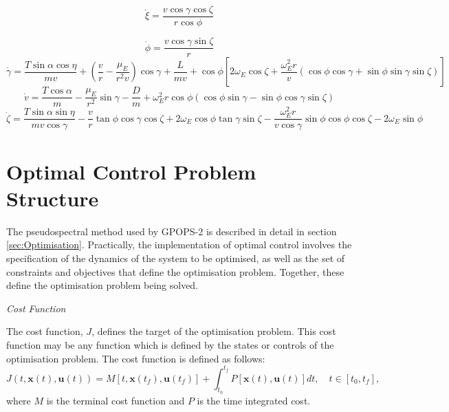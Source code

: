 \begin{equation}
\dot{\xi} = \frac{v\cos \gamma \cos \zeta}{r \cos \phi}
\end{equation}

\begin{equation}
\dot{\phi} = \frac{v\cos\gamma\sin\zeta}{r}
\end{equation}
\begin{equation}
\dot{\gamma} = \frac{T\sin\alpha \cos\eta}{mv} + (\frac{v}{r}-\frac{\mu_E}{r^2 v})\cos\gamma + \frac{L}{mv}
+ \cos\phi[2\omega_E \cos\zeta + \frac{\omega_E^2 r}{v}(\cos\phi\cos\gamma+\sin\phi\sin\gamma\sin\zeta)]
\end{equation}
\begin{equation}
\dot{v} = \frac{T\cos\alpha}{m}-\frac{\mu_E}{r^2}\sin\gamma - \frac{D}{m}
+ \omega_E^2 r\cos\phi(\cos\phi\sin\gamma-\sin\phi\cos\gamma\sin\zeta)
\end{equation}
\begin{equation}\label{eq:heading}
\dot{\zeta} = \frac{T\sin\alpha \sin\eta}{mv \cos \gamma}-\frac{v}{r}\tan\phi\cos\gamma\cos\zeta +2\omega_E\cos\phi\tan\gamma\sin\zeta - \frac{\omega_E^2 r}{v\cos\gamma}\sin\phi\cos\phi\cos\zeta-2\omega_E\sin\phi 
\end{equation}






\section{Optimal Control Problem Structure}

The pseudospectral method used by GPOPS-2 is described in detail in section \ref{sec:Optimisation}. Practically, the implementation of optimal control involves the specification of the dynamics of the system to be optimised, as well as the set of constraints and objectives that define the optimisation problem. 
 Together, these define the optimisation problem being solved.

\noindent \textit{Cost Function}

\noindent The cost function, $J$, defines the target of the optimisation problem. 
This cost function may be any function which is defined by the states or controls of the optimisation problem. The cost function is defined as follows:
\begin{equation} \label{eq:cost}
J(t,\textbf{x}(t),\textbf{u}(t)) = M[t,\textbf{x}(t_f),\textbf{u}(t_f)] +   \int_{t_0}^{t_f} P[\textbf{x}(t),\textbf{u}(t)] dt, \quad t \in [t_0,t_f],
\end{equation}
where $M$ is the terminal cost function and $P$ is the time integrated cost. 


